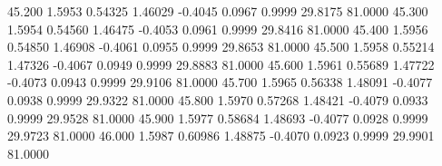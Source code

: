   45.200   1.5953   0.54325   1.46029  -0.4045   0.0967   0.9999  29.8175  81.0000
  45.300   1.5954   0.54560   1.46475  -0.4053   0.0961   0.9999  29.8416  81.0000
  45.400   1.5956   0.54850   1.46908  -0.4061   0.0955   0.9999  29.8653  81.0000
  45.500   1.5958   0.55214   1.47326  -0.4067   0.0949   0.9999  29.8883  81.0000
  45.600   1.5961   0.55689   1.47722  -0.4073   0.0943   0.9999  29.9106  81.0000
  45.700   1.5965   0.56338   1.48091  -0.4077   0.0938   0.9999  29.9322  81.0000
  45.800   1.5970   0.57268   1.48421  -0.4079   0.0933   0.9999  29.9528  81.0000
  45.900   1.5977   0.58684   1.48693  -0.4077   0.0928   0.9999  29.9723  81.0000
  46.000   1.5987   0.60986   1.48875  -0.4070   0.0923   0.9999  29.9901  81.0000
